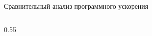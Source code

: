 \documentclass[ignoreonframetext,unicode,aspectratio=169]{beamer}
\begin{document}
\begin{frame}{Сравнительный анализ программного ускорения}
\begin{columns}[c]
			\begin{column}{0.55\textwidth}
				

\end{column}
\end{columns}
\end{frame}
\end{document}

